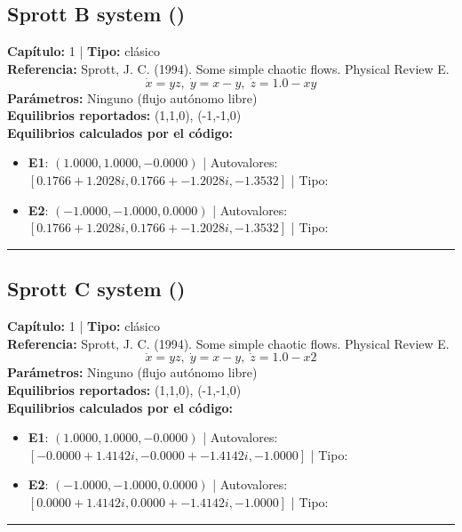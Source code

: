 \subsection*{Sprott B system ()}
\textbf{Capítulo:} 1 | \textbf{Tipo:} clásico\\
\textbf{Referencia:} Sprott, J. C. (1994). Some simple chaotic flows. Physical Review E.\\
\[\dot{x}=yz, \; \dot{y}=x-y, \; \dot{z}=1.0-xy\]
\textbf{Parámetros:} Ninguno (flujo autónomo libre)\\
\textbf{Equilibrios reportados:} (1,1,0), (-1,-1,0)\\
\textbf{Equilibrios calculados por el código:}
\begin{itemize}
  \item \textbf{E1}: $(1.0000, 1.0000, -0.0000)$ | Autovalores: $[0.1766 + 1.2028i, 0.1766 + -1.2028i, -1.3532]$ | Tipo: 
  \item \textbf{E2}: $(-1.0000, -1.0000, 0.0000)$ | Autovalores: $[0.1766 + 1.2028i, 0.1766 + -1.2028i, -1.3532]$ | Tipo: 
\end{itemize}
\hrule

\subsection*{Sprott C system ()}
\textbf{Capítulo:} 1 | \textbf{Tipo:} clásico\\
\textbf{Referencia:} Sprott, J. C. (1994). Some simple chaotic flows. Physical Review E.\\
\[\dot{x}=yz, \; \dot{y}=x-y, \; \dot{z}=1.0-x2\]
\textbf{Parámetros:} Ninguno (flujo autónomo libre)\\
\textbf{Equilibrios reportados:} (1,1,0), (-1,-1,0)\\
\textbf{Equilibrios calculados por el código:}
\begin{itemize}
  \item \textbf{E1}: $(1.0000, 1.0000, -0.0000)$ | Autovalores: $[-0.0000 + 1.4142i, -0.0000 + -1.4142i, -1.0000]$ | Tipo: 
  \item \textbf{E2}: $(-1.0000, -1.0000, 0.0000)$ | Autovalores: $[0.0000 + 1.4142i, 0.0000 + -1.4142i, -1.0000]$ | Tipo: 
\end{itemize}
\hrule

